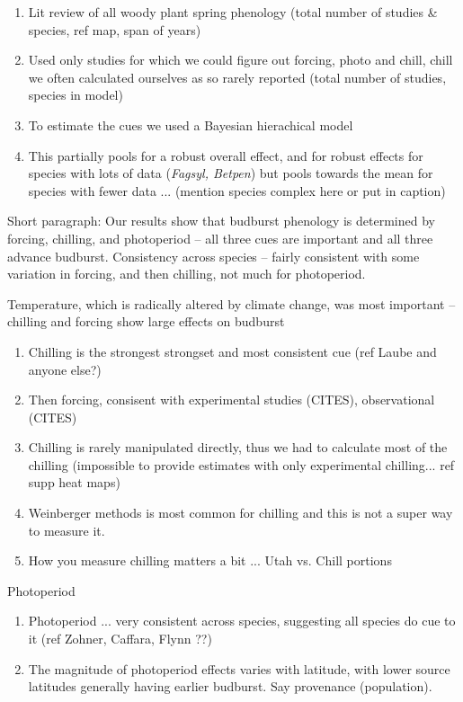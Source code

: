 \documentclass[11pt,letter]{article}
\begin{document}
{\begin{enumerate}
\item Lit review of all woody plant spring phenology (total number of studies \& species, ref map, span of years)
\item Used only studies for which we could figure out forcing, photo and chill, chill we often calculated ourselves as so rarely reported (total number of studies, species in model)
\item To estimate the cues we used a Bayesian hierachical model 
\item This partially pools for a robust overall effect, and for robust effects for species with lots of data (\emph{Fagsyl, Betpen}) but pools towards the mean for species with fewer data ... (mention species complex here or put in caption)
\end{enumerate}
\item Short paragraph: Our results show that budburst phenology is determined by forcing, chilling, and photoperiod -- all three cues are important and all three advance budburst. Consistency across species -- fairly consistent with some variation in forcing, and then chilling, not much for photoperiod. 
\item Temperature, which is radically altered by climate change, was most important -- chilling and forcing show large effects on budburst
\begin{enumerate}
\item Chilling is the strongest strongset and most consistent cue (ref Laube and anyone else?)
\item Then forcing, consisent with experimental studies (CITES), observational (CITES)
\item Chilling is rarely manipulated directly, thus we had to calculate most of the chilling (impossible to provide estimates with only experimental chilling... ref supp heat maps)
\item Weinberger methods is most common for chilling and this is not a super way to measure it.
\item How you measure chilling matters a bit ... Utah vs. Chill portions
\end{enumerate}
\item Photoperiod
\begin{enumerate}
\item Photoperiod ... very consistent across species, suggesting all species do cue to it (ref Zohner, Caffara, Flynn ??)
\item The magnitude of photoperiod effects varies with latitude, with lower source latitudes generally having earlier budburst. Say provenance (population). 

\end{enumerate}}
\end{document}
